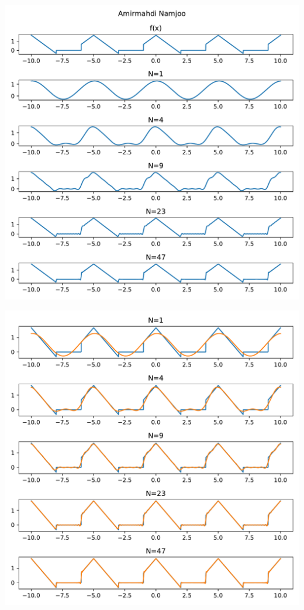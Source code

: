 \documentclass[12pt]{article}
\begin{document}
\begin{center}
	\includegraphics[width = 1.0 \textwidth]{images/6-1.pdf}
\end{center}



\begin{center}
	\includegraphics[width = 1.0 \textwidth]{images/6-2.pdf}
\end{center}
\end{document}
